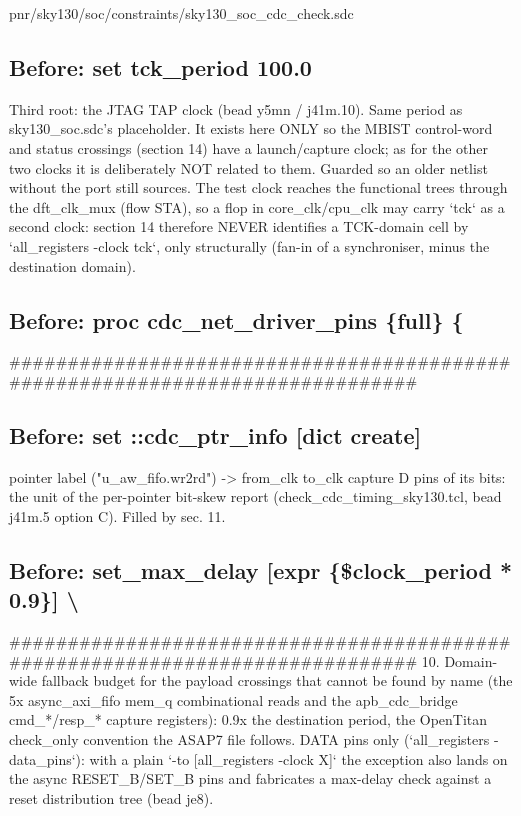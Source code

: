 \begin{relocated}{pnr/sky130/soc/constraints/sky130_soc_cdc_check.sdc}
\subsection*{Before: set tck\_period 100.0}

\begin{textblock}
Third root: the JTAG TAP clock (bead y5mn / j41m.10). Same period as sky130_soc.sdc's placeholder. It exists
here ONLY so the MBIST control-word and status crossings (section 14) have a launch/capture clock; as for
the other two clocks it is deliberately NOT related to them. Guarded so an older netlist without the port
still sources. The test clock reaches the functional trees through the dft_clk_mux (flow STA), so a flop in
core_clk/cpu_clk may carry `tck` as a second clock: section 14 therefore NEVER identifies a TCK-domain cell
by `all_registers -clock tck`, only structurally (fan-in of a synchroniser, minus the destination domain).
\end{textblock}

\subsection*{Before: proc cdc\_net\_driver\_pins \{full\} \{}

\begin{textblock}
##############################################################################
\end{textblock}

\subsection*{Before: set ::cdc\_ptr\_info [dict create]}

\begin{textblock}
pointer label ("u_aw_fifo.wr2rd") -> {from_clk to_clk {capture D pins of its bits}}: the unit of the
per-pointer bit-skew report (check_cdc_timing_sky130.tcl, bead j41m.5 option C). Filled by sec. 11.
\end{textblock}

\subsection*{Before: set\_max\_delay [expr \{\$clock\_period * 0.9\}] \textbackslash{}}

\begin{textblock}
##############################################################################
10. Domain-wide fallback budget for the payload crossings that cannot be found by name
    (the 5x async_axi_fifo mem_q combinational reads and the apb_cdc_bridge cmd_*/resp_*
    capture registers): 0.9x the destination period, the OpenTitan check_only convention
    the ASAP7 file follows. DATA pins only (`all_registers -data_pins`): with a plain
    `-to [all_registers -clock X]` the exception also lands on the async RESET_B/SET_B
    pins and fabricates a max-delay check against a reset distribution tree (bead je8).


\end{textblock}
\end{relocated}
